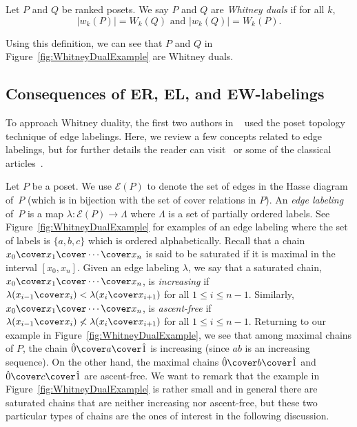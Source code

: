 \begin{defi}
Let $P$ and $Q$ be ranked posets.  We say $P$ and $Q$ are  \emph{Whitney duals} if for all $k$,
$$
|w_k(P)| = W_k(Q) \mbox{ and }  |w_k(Q)| = W_k(P).
$$
\end{defi}

\noindent Using this definition, we can see that $P$ and $Q$ in Figure~\ref{fig:WhitneyDualExample} are Whitney duals.


\subsection{Consequences of ER, EL, and EW-labelings}

To approach Whitney duality, the first two authors in ~\cite{GonzalezHallam2021} used the poset topology technique of edge labelings.    Here, we review  a few concepts related to edge labelings, but for further details the reader can visit~\cite{Wachs2007,Stanley2012} or some of the classical articles~\cite{Stanley1974,Bjorner1980,BjornerWachs1983,BjornerWachs1996,BjornerWachs1997}.

Let $P$ be a poset. We use $\mathcal{E}(P)$ to denote the set of edges in the Hasse diagram of~$P$ (which is  in bijection with the set of cover relations in $P$).  An \emph{edge labeling} of~$P$ is a map $\lambda:  \mathcal{E}(P)\rightarrow \Lambda$ where $\Lambda$ is a set of partially ordered labels.    See Figure~\ref{fig:WhitneyDualExample} for   examples of an edge labeling where the set of labels is $\{a,b,c\}$ which is ordered alphabetically.  Recall that a chain $x_0\cover x_1\cover \cdots\cover x_n$ is said to be saturated if it is maximal in the interval $[x_0,x_n]$. Given an edge labeling $\lambda$, we say  that a saturated chain, $x_0\cover x_1\cover \cdots\cover x_n$,  is \emph{increasing} if $\lambda(x_{i-1}\cover x_{i}) < \lambda(x_{i}\cover x_{i+1})$ for all $1\leq i\leq n-1$.  Similarly, $x_0\cover x_1\cover \cdots\cover x_n$,  is \emph{ascent-free} if $\lambda(x_{i-1}\cover x_{i}) \not < \lambda(x_{i}\cover x_{i+1})$ for all $1\leq i\leq n-1$.  Returning to our example    in   Figure~\ref{fig:WhitneyDualExample}, we see that among maximal chains of $P$, the chain $\hat{0}\cover a\cover \hat{1}$ is increasing (since $ab$ is an increasing sequence).  On the other hand, the maximal chains $\hat{0}\cover b \cover \hat{1}$ and $\hat{0}\cover c\cover \hat{1}$ are ascent-free.  We want to remark that the example in  Figure~\ref{fig:WhitneyDualExample} is rather small and in general there are saturated chains that are neither increasing nor ascent-free, but these two particular types of chains are the ones of interest in the following discussion.

